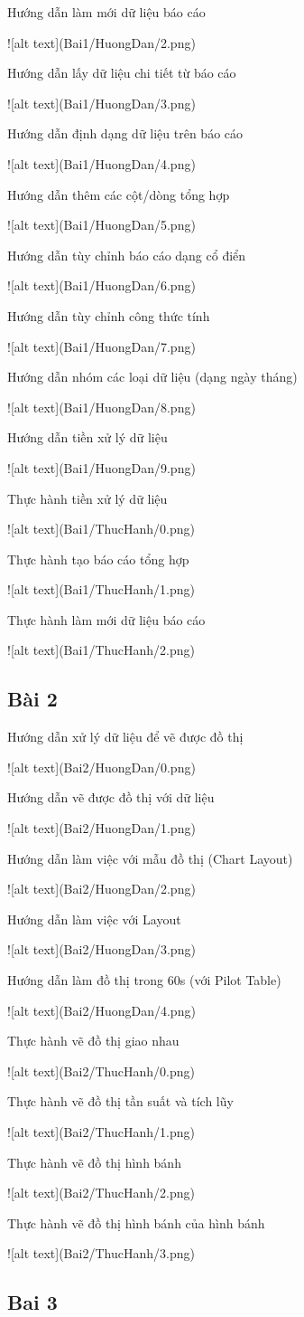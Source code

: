 \documentclass{article}
\begin{document}
\caption{Hướng dẫn làm mới dữ liệu báo cáo}
![alt text](Bai1/HuongDan/2.png)
\caption{Hướng dẫn lấy dữ liệu chi tiết từ báo cáo}
![alt text](Bai1/HuongDan/3.png)
\caption{Hướng dẫn định dạng dữ liệu trên báo cáo}
![alt text](Bai1/HuongDan/4.png)
\caption{Hướng dẫn thêm các cột/dòng tổng hợp}
![alt text](Bai1/HuongDan/5.png)
\caption{Hướng dẫn tùy chỉnh báo cáo dạng cổ điển}
![alt text](Bai1/HuongDan/6.png)
\caption{Hướng dẫn tùy chỉnh công thức tính}
![alt text](Bai1/HuongDan/7.png)
\caption{Hướng dẫn nhóm các loại dữ liệu (dạng ngày tháng)}
![alt text](Bai1/HuongDan/8.png)
\caption{Hướng dẫn tiền xử lý dữ liệu}
![alt text](Bai1/HuongDan/9.png)

\caption{Thực hành tiền xử lý dữ liệu}
![alt text](Bai1/ThucHanh/0.png)
\caption{Thực hành tạo báo cáo tổng hợp}
![alt text](Bai1/ThucHanh/1.png)
\caption{Thực hành làm mới dữ liệu báo cáo}
![alt text](Bai1/ThucHanh/2.png)
\subsection{Bài 2}

\caption{Hướng dẫn xử lý dữ liệu để vẽ được đồ thị }
![alt text](Bai2/HuongDan/0.png)

\caption{Hướng dẫn vẽ được đồ thị với dữ liệu}
![alt text](Bai2/HuongDan/1.png)

\caption{Hướng dẫn làm việc với mẫu đồ thị (Chart Layout)}
![alt text](Bai2/HuongDan/2.png)

\caption{Hướng dẫn làm việc với Layout}
![alt text](Bai2/HuongDan/3.png)

\caption{Hướng dẫn làm đồ thị trong 60s (với Pilot Table)}
![alt text](Bai2/HuongDan/4.png)


\caption{Thực hành vẽ đồ thị giao nhau}
![alt text](Bai2/ThucHanh/0.png)
\caption{Thực hành vẽ đồ thị tần suất và tích lũy}
![alt text](Bai2/ThucHanh/1.png)
\caption{Thực hành vẽ đồ thị hình bánh}
![alt text](Bai2/ThucHanh/2.png)
\caption{Thực hành vẽ đồ thị hình bánh của hình bánh}
![alt text](Bai2/ThucHanh/3.png)
\subsection{Bai 3}

\end{document}
